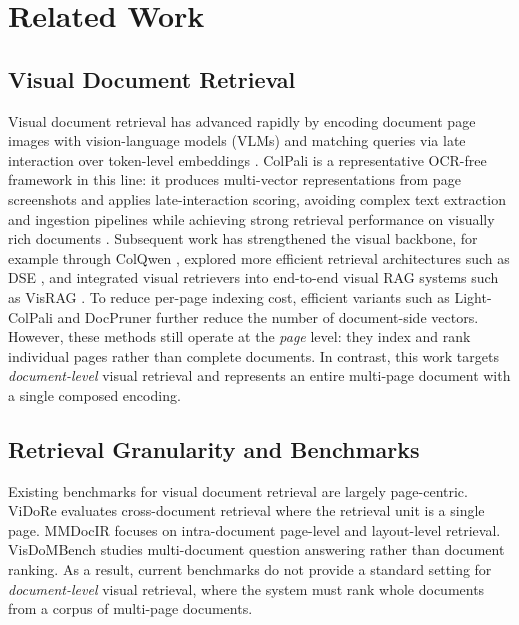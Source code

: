 \section{Related Work}

\subsection{Visual Document Retrieval}

Visual document retrieval has advanced rapidly by encoding document page images with vision-language models (VLMs) and matching queries via late interaction over token-level embeddings \citep{faysse2024colpali,khattab2020colbert,santhanam-etal-2022-colbertv2}. ColPali is a representative OCR-free framework in this line: it produces multi-vector representations from page screenshots and applies late-interaction scoring, avoiding complex text extraction and ingestion pipelines while achieving strong retrieval performance on visually rich documents \citep{faysse2024colpali}. Subsequent work has strengthened the visual backbone, for example through ColQwen \citep{faysse2024colpali}, explored more efficient retrieval architectures such as DSE \citep{ma2024dse}, and integrated visual retrievers into end-to-end visual RAG systems such as VisRAG \citep{yu2025visrag}. To reduce per-page indexing cost, efficient variants such as Light-ColPali \citep{ma2025lightcolpali} and DocPruner \citep{yan2025docpruner} further reduce the number of document-side vectors. However, these methods still operate at the \emph{page} level: they index and rank individual pages rather than complete documents. In contrast, this work targets \emph{document-level} visual retrieval and represents an entire multi-page document with a single composed encoding.

\subsection{Retrieval Granularity and Benchmarks}

Existing benchmarks for visual document retrieval are largely page-centric. ViDoRe \citep{faysse2024colpali,mace2025vidore2} evaluates cross-document retrieval where the retrieval unit is a single page. MMDocIR \citep{dong2025mmdocir} focuses on intra-document page-level and layout-level retrieval. VisDoMBench \citep{suri2025visdombench} studies multi-document question answering rather than document ranking. As a result, current benchmarks do not provide a standard setting for \emph{document-level} visual retrieval, where the system must rank whole documents from a corpus of multi-page documents.

